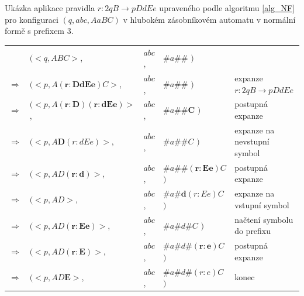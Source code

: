 \begin{Example}
Ukázka aplikace pravidla $r: 2q B \rightarrow p DdEe$ upraveného podle algoritmu \ref{alg_NF} pro konfiguraci $(q, abc, AaBC)$ v hlubokém zásobníkovém automatu v normální formě s prefixem 3.




\begin{center}
\begin{tabular}{llll|l}
                & $( <q, ABC>$,              & $abc$, & $\#a\#\#$                    $)$ &  \\
$\Rightarrow$   & $( <p, A\mathbf{(r: DdEe)}C>$,      & $abc$, & $\#a\#\#$           $)$ & expanze $r: 2q B \rightarrow p DdEe$\\
$\Rightarrow$   & $( <p, A\mathbf{(r: D) (r: dEe)}>$, & $abc$, & $\#a\#\#\mathbf{C}$ $)$ & postupná expanze\\
$\Rightarrow$   & $( <p, A\mathbf{D}(r: dEe)>$,       & $abc$, & $\#a\#\#C$          $)$ & expanze na nevstupní symbol\\
$\Rightarrow$   & $( <p, AD\mathbf{(r: d)}>$,         & $abc$, & $\#a\#\#\mathbf{(r: Ee)}C$   $)$ & postupná expanze \\
$\Rightarrow$   & $( <p, AD>$,               & $abc$, & $\#a\#\mathbf{d}(r: Ee)C$    $)$        & expanze na vstupní symbol\\
$\Rightarrow$   & $( <p, AD\mathbf{(r: Ee)}>$,        & $abc$, & $\#a\#d\mathbf{\#}C$   $)$     & načtení symbolu do prefixu\\
$\Rightarrow$   & $( <p, AD\mathbf{(r: E)}>$,         & $abc$, & $\#a\#d\#\mathbf{(r: e)}C$$)$  & postupná expanze\\
$\Rightarrow$   & $( <p, AD\mathbf{E}>$,         & $abc$, & $\#a\#d\#(r: e)C$        $)$        & konec

\end{tabular}
\end{center}

\end{Example}






